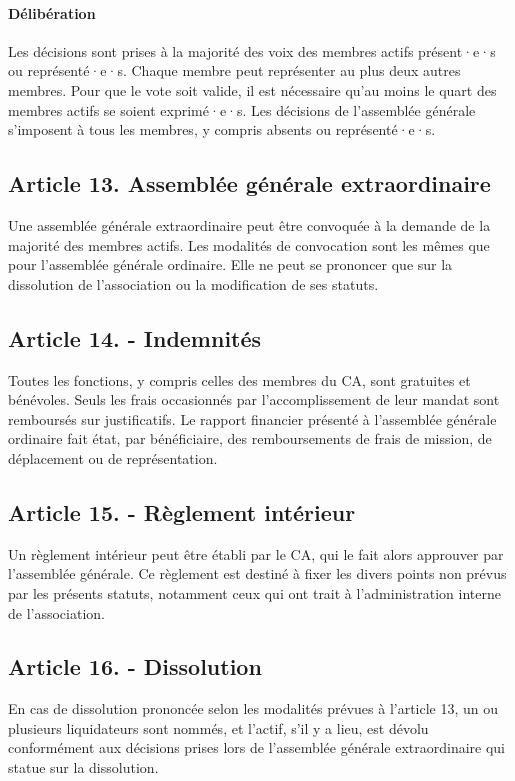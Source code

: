 \documentclass[a4paper]{article}
\begin{document}
\paragraph{Délibération}
Les décisions sont prises à la majorité des voix des membres actifs présent·e·s ou représenté·e·s. Chaque
membre peut représenter au plus deux autres membres.
Pour que le vote soit valide, il est nécessaire qu'au moins le quart des membres actifs se soient exprimé·e·s.
Les décisions de l'assemblée générale s'imposent à tous les membres, y compris absents ou
représenté·e·s.

\subsection*{Article 13. Assemblée générale extraordinaire}

Une assemblée générale extraordinaire peut être convoquée à la demande de la majorité
des membres actifs.
Les modalités de convocation sont les mêmes que pour l'assemblée générale ordinaire.
Elle ne peut se prononcer que sur la
dissolution de l'association ou la modification de ses statuts.

\subsection*{Article 14. - Indemnités}

Toutes les fonctions, y compris celles des membres du CA, sont gratuites et
bénévoles. Seuls les frais occasionnés par l'accomplissement de leur mandat sont
remboursés sur justificatifs. Le rapport financier présenté à l'assemblée générale
ordinaire fait état, par bénéficiaire, des remboursements de frais de mission,
de déplacement ou de représentation.

\subsection*{Article 15. - Règlement intérieur}

Un règlement intérieur peut être établi par le CA, qui le fait alors
approuver par l'assemblée générale.
Ce règlement est destiné à fixer les divers points non prévus par les présents statuts,
notamment ceux qui ont trait à l'administration interne de l'association.

\subsection*{Article 16. - Dissolution}

En cas de dissolution prononcée selon les modalités prévues à l'article 13, un ou plusieurs
liquidateurs sont nommés, et l'actif, s'il y a lieu, est dévolu conformément aux décisions
prises lors de l'assemblée générale extraordinaire qui statue sur la dissolution.
\end{document}
